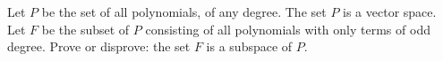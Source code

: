 Let $P$ be the set of all polynomials, of any degree.  The set $P$ is a vector space.  Let $F$ be the subset of $P$ consisting of all polynomials with only terms of odd degree.  Prove or disprove:  the set $F$ is a subspace of $P$.